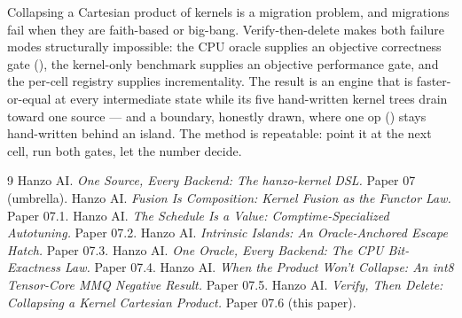 \documentclass[11pt]{article}
\begin{document}
Collapsing a Cartesian product of kernels is a migration problem, and migrations fail when they are
faith-based or big-bang. Verify-then-delete makes both failure modes structurally impossible: the CPU
oracle supplies an objective correctness gate (\cite{oracle}), the kernel-only benchmark supplies an
objective performance gate, and the per-cell registry supplies incrementality. The result is an engine
that is faster-or-equal at every intermediate state while its five hand-written kernel trees drain toward
one source --- and a boundary, honestly drawn, where one op (\cite{mmq}) stays hand-written behind an
island. The method is repeatable: point it at the next cell, run both gates, let the number decide.

\begin{thebibliography}{9}
\small
{} Hanzo AI. \emph{One Source, Every Backend: The hanzo-kernel DSL.} Paper 07 (umbrella).
 Hanzo AI. \emph{Fusion Is Composition: Kernel Fusion as the Functor Law.} Paper 07.1.
 Hanzo AI. \emph{The Schedule Is a Value: Comptime-Specialized Autotuning.} Paper 07.2.
 Hanzo AI. \emph{Intrinsic Islands: An Oracle-Anchored Escape Hatch.} Paper 07.3.
 Hanzo AI. \emph{One Oracle, Every Backend: The CPU Bit-Exactness Law.} Paper 07.4.
 Hanzo AI. \emph{When the Product Won't Collapse: An int8 Tensor-Core MMQ Negative Result.} Paper 07.5.
 Hanzo AI. \emph{Verify, Then Delete: Collapsing a Kernel Cartesian Product.} Paper 07.6 (this paper).
\end{thebibliography}
\end{document}
